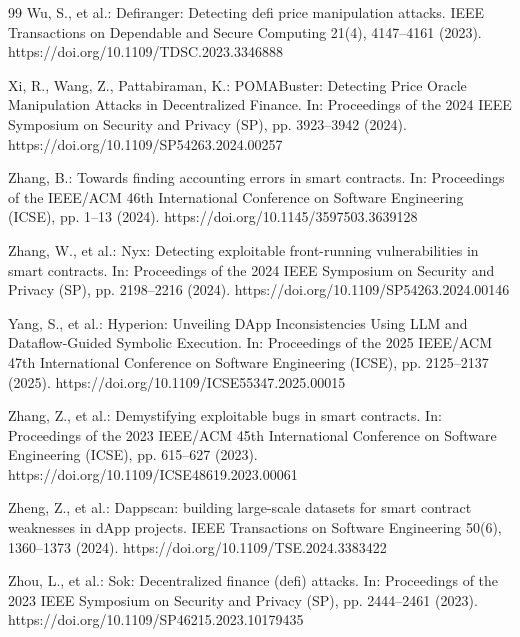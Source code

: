 \documentclass[pdflatex,sn-basic]{sn-jnl}%
\theoremstyle{thmstyleone}%
\theoremstyle{thmstyletwo}%
\theoremstyle{thmstylethree}%
\begin{document}
\begin{thebibliography}{99}
Wu, S., et al.: Defiranger: Detecting defi price manipulation attacks. IEEE Transactions on Dependable and Secure Computing 21(4), 4147--4161 (2023). https://doi.org/10.1109/TDSC.2023.3346888

Xi, R., Wang, Z., Pattabiraman, K.: POMABuster: Detecting Price Oracle Manipulation Attacks in Decentralized Finance. In: Proceedings of the 2024 IEEE Symposium on Security and Privacy (SP), pp. 3923--3942 (2024). https://doi.org/10.1109/SP54263.2024.00257

Zhang, B.: Towards finding accounting errors in smart contracts. In: Proceedings of the IEEE/ACM 46th International Conference on Software Engineering (ICSE), pp. 1--13 (2024). https://doi.org/10.1145/3597503.3639128

Zhang, W., et al.: Nyx: Detecting exploitable front-running vulnerabilities in smart contracts. In: Proceedings of the 2024 IEEE Symposium on Security and Privacy (SP), pp. 2198--2216 (2024). https://doi.org/10.1109/SP54263.2024.00146

Yang, S., et al.: Hyperion: Unveiling DApp Inconsistencies Using LLM and Dataflow-Guided Symbolic Execution. In: Proceedings of the 2025 IEEE/ACM 47th International Conference on Software Engineering (ICSE), pp. 2125--2137 (2025). https://doi.org/10.1109/ICSE55347.2025.00015

Zhang, Z., et al.: Demystifying exploitable bugs in smart contracts. In: Proceedings of the 2023 IEEE/ACM 45th International Conference on Software Engineering (ICSE), pp. 615--627 (2023). https://doi.org/10.1109/ICSE48619.2023.00061

Zheng, Z., et al.: Dappscan: building large-scale datasets for smart contract weaknesses in dApp projects. IEEE Transactions on Software Engineering 50(6), 1360--1373 (2024). https://doi.org/10.1109/TSE.2024.3383422

Zhou, L., et al.: Sok: Decentralized finance (defi) attacks. In: Proceedings of the 2023 IEEE Symposium on Security and Privacy (SP), pp. 2444--2461 (2023). https://doi.org/10.1109/SP46215.2023.10179435

\end{thebibliography}

\FloatBarrier
\newpage
\appendix
\end{document}
